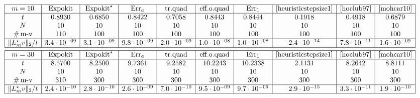 \documentclass[smallextended]{svjour3pre}%
\numberwithin{equation}{section}
\numberwithin{figure}{section}
\numberwithin{table}{section}
\newcommand{\ttol}{{\rm tol}}
\newcommand\Era{\mathrm{Err}_a}
\newcommand\Erone{\mathrm{Err}_1}
\begin{document}
\begin{table}
\centering
\caption{
The displayed step size $t$ is the sum of $N=10$ substeps computed by different versions of step size control,
as described above.
In the top table we show the results for $m=10$,
in the bottom table for $m=30$,
both for tolerance $\ttol=10^{-8}$, for the Hubbard Hamiltonian.
}
\label{table:stepsize10steps}
\begin{equation*}
\begin{aligned}
&\begin{array}{|c|c|c|c|c|c|c|c|c|c|}\hline
m=10
& \text{Expokit}
& \text{Expokit}^{\star}
& \Era
& \text{tr.quad}
& \text{eff.o.quad}
& \text{$\Erone$}
& \eqref{heuristicstepsize1}
& \text{\cite[Th. 4]{hoclub97}}
& \text{\cite[(20)]{mohcar10}}
\\\hline
t
&0.8930  &  0.6850  &  0.8422  &  0.7058  &  0.8443  &  0.8444  &  0.1918  &  0.4918  &  0.6879\\
 N
&10&10&10&10&10&10&10&10&10 \\
\text{\#\,m-v}
& 110 & 100 & 100 & 100 & 100 & 100 & 100 & 100 & 100\\\hline
\|L_m^{\star} v\|_2/t
& 3.4\cdot 10^{-09} & 3.1\cdot 10^{-09} & 9.8\cdot 10^{-09} & 2.0\cdot 10^{-09} & 1.0\cdot 10^{-08} & 1.0\cdot 10^{-08} & 2.4\cdot 10^{-14} & 7.8\cdot 10^{-11} & 1.6\cdot 10^{-09} \\\hline
\end{array}&
\\
&\begin{array}{|c|c|c|c|c|c|c|c|c|c|}\hline
m=30
& \text{Expokit}
& \text{Expokit}^{\star}
& \Era
& \text{tr.quad}
& \text{eff.o.quad}
& \text{$\Erone$}
& \eqref{heuristicstepsize1}
& \text{\cite[Th. 4]{hoclub97}}
& \text{\cite[(20)]{mohcar10}}
\\\hline
t
& 8.5700  &  8.2500  &  9.7361  &  9.2582 &  10.2243  & 10.2338  &  2.1131  &  8.2642  &  8.8111 \\
 N
&10&10&10&10&10&10&10&10&10 \\
\text{\#\,m-v}
& 310 & 300 & 300 & 300 & 300 & 300 & 300 & 300 & 300\\\hline
\|L_m^{\star} v\|_2/t
& 2.4\cdot 10^{-10} & 2.8\cdot 10^{-10} & 2.6\cdot 10^{-09} & 7.0\cdot 10^{-10} & 9.5\cdot 10^{-09} & 9.7\cdot 10^{-09}& 2.9\cdot 10^{-15} & 3.3\cdot 10^{-11} & 1.9\cdot 10^{-10} \\\hline
\end{array}&
\end{aligned}
\end{equation*}
\end{table}
\end{document}
